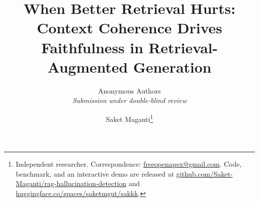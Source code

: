 \documentclass[11pt]{article}
\title{\LARGE\bfseries When Better Retrieval Hurts:\\[0.3em]
Context Coherence Drives Faithfulness in Retrieval-Augmented Generation}
\author{Anonymous Authors\\\textit{Submission under double-blind review}}
\author{%
    Saket Maganti\thanks{%
      Independent researcher.  Correspondence:
      \href{mailto:freeopenapex@gmail.com}{freeopenapex@gmail.com}.
      Code, benchmark, and an interactive demo are released at
      \href{https://github.com/Saket-Maganti/rag-hallucination-detection}{github.com/Saket-Maganti/rag-hallucination-detection}
      and
      \href{https://huggingface.co/spaces/saketmgnt/sakkk}{huggingface.co/spaces/saketmgnt/sakkk}.
    }
  }
\date{}
\theoremstyle{plain}
\theoremstyle{definition}
\begin{document}
\maketitle

\begin{abstract}

\end{abstract}














\appendix

\end{document}
